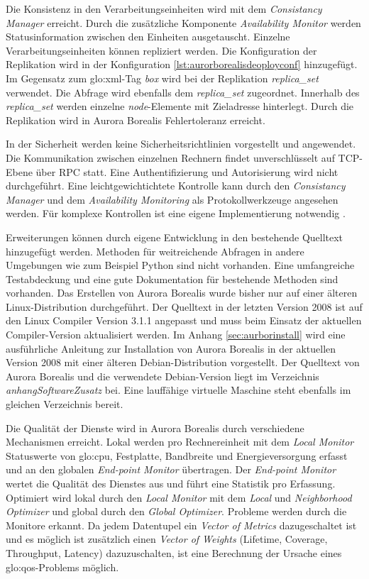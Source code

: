 Die Konsistenz in den Verarbeitungseinheiten wird mit dem \textit{Consistancy Manager} erreicht. Durch die zusätzliche Komponente \textit{Availability Monitor} werden Statusinformation zwischen den Einheiten ausgetauscht. Einzelne Verarbeitungseinheiten können repliziert werden. Die Konfiguration der Replikation wird in der Konfiguration \ref{lst:aurorborealisdeoployconf} hinzugefügt. Im Gegensatz zum \gls{glo:xml}-Tag \textit{box} wird bei der Replikation \textit{replica\_set} verwendet. Die Abfrage wird ebenfalls dem \textit{replica\_set} zugeordnet. Innerhalb des \textit{replica\_set} werden einzelne \textit{node}-Elemente mit Zieladresse hinterlegt. Durch die Replikation wird in Aurora Borealis Fehlertoleranz erreicht. 

In der Sicherheit werden keine Sicherheitsrichtlinien vorgestellt und angewendet. Die Kommunikation zwischen einzelnen Rechnern findet unverschlüsselt auf TCP-Ebene über RPC statt. Eine Authentifizierung und Autorisierung wird nicht durchgeführt. Eine leichtgewichtichtete Kontrolle kann durch den \textit{Consistancy Manager} und dem \textit{Availability Monitoring} als Protokollwerkzeuge angesehen werden. Für komplexe Kontrollen ist eine eigene Implementierung notwendig .

Erweiterungen können durch eigene Entwicklung in den bestehende Quelltext hinzugefügt werden. Methoden für weitreichende Abfragen in andere Umgebungen wie zum Beispiel Python sind nicht vorhanden. Eine umfangreiche Testabdeckung und eine gute Dokumentation für bestehende Methoden sind vorhanden. Das Erstellen von Aurora Borealis wurde bisher nur auf einer älteren Linux-Distribution durchgeführt. Der Quelltext in der letzten Version 2008 ist auf den Linux Compiler Version 3.1.1 angepasst und muss beim Einsatz der aktuellen Compiler-Version aktualisiert werden. Im Anhang \ref{sec:aurborinstall} wird eine ausführliche Anleitung zur Installation von Aurora Borealis in der aktuellen Version 2008 mit einer älteren Debian-Distribution vorgestellt. Der Quelltext von Aurora Borealis und die verwendete Debian-Version liegt im Verzeichnis \textit{anhangSoftwareZusatz} bei. Eine lauffähige virtuelle Maschine steht ebenfalls im gleichen Verzeichnis bereit.

Die Qualität der Dienste wird in Aurora Borealis durch verschiedene Mechanismen erreicht. Lokal werden pro Rechnereinheit mit dem \textit{Local Monitor} Statuswerte von \gls{glo:cpu}, Festplatte, Bandbreite und Energieversorgung erfasst und an den globalen \textit{End-point Monitor }übertragen. Der \textit{End-point Monitor} wertet die Qualität des Dienstes aus und führt eine Statistik pro Erfassung. Optimiert wird lokal durch den \textit{Local Monitor} mit dem \textit{Local} und \textit{Neighborhood Optimizer} und global durch den \textit{Global Optimizer}. Probleme werden durch die Monitore erkannt. Da jedem Datentupel ein \textit{Vector of Metrics} dazugeschaltet ist und es möglich ist zusätzlich einen \textit{Vector of Weights} (Lifetime, Coverage, Throughput, Latency) dazuzuschalten, ist eine Berechnung der Ursache eines \gls{glo:qos}-Problems möglich. 

